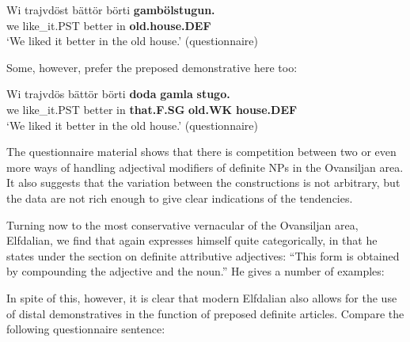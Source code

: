 \ea\label{}
\gll Wi  trajvdöst  bättör  börti  \textbf{gambölstugun.}\\
we  like\_it.PST  better  in  \textbf{old.house.DEF}\\
\glt ‘We liked it better in the old house.’ (questionnaire)
\z

Some, however, prefer the preposed demonstrative here too:

\ea\label{}
\gll Wi  trajvdös  bättör  börti  \textbf{doda} \textbf{gamla} \textbf{stugo.}\\
we  like\_it.PST  better  in  \textbf{that.F.SG} \textbf{old.WK} \textbf{house.DEF}\\
\glt ‘We liked it better in the old house.’ (questionnaire)
\z

The questionnaire material shows that there is competition between two or even more ways of handling adjectival modifiers of definite NPs in the Ovansiljan area. It also suggests that the variation between the constructions is not arbitrary, but the data are not rich enough to give clear indications of the tendencies. 

Turning now to the most conservative vernacular of the Ovansiljan area, Elfdalian, we find that \citet[53]{Levander1909} again expresses himself quite categorically, in that he states under the section on definite attributive adjectives: “This form is obtained by compounding the adjective and the noun.” He gives a number of examples:

\ea\label{}



\z 
\z 

In spite of this, however, it is clear that modern Elfdalian also allows for the use of distal demonstratives in the function of preposed definite articles. Compare the following questionnaire sentence:

